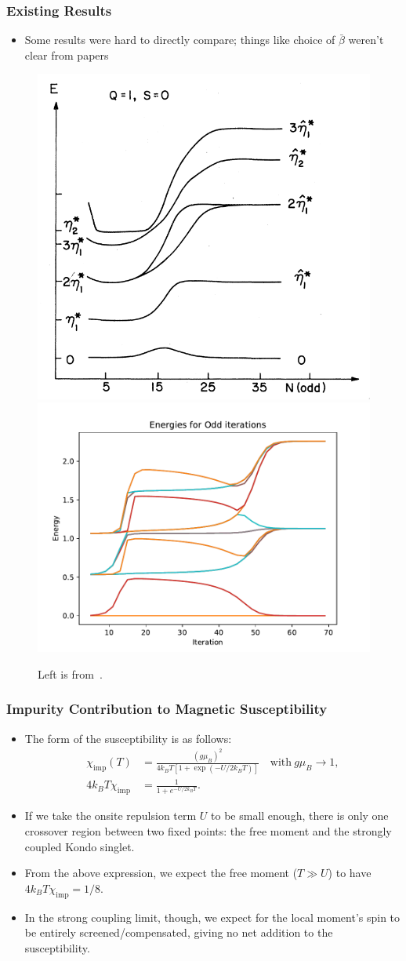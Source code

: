 \documentclass{beamer}
\begin{document}
\begin{frame}
  \frametitle{Existing Results}

  \begin{itemize}
  \item Some results were hard to directly compare; things like choice of $\bar{\beta}$ weren't clear from papers
  \end{itemize}

  \begin{figure}
    \centering
    \includegraphics[width=0.49\linewidth]{./gfx/krishna-murthy-energies.png}
    \includegraphics[width=0.49\linewidth]{./gfx/odd.pdf}
    \caption{Left is from~\cite{Krishna-murthy_Wilkins_Wilson_1980}.}
  \end{figure}
\end{frame}

\begin{frame}
  \frametitle{Impurity Contribution to Magnetic Susceptibility}

  \begin{itemize}
  \item The form of the susceptibility is as follows:
    \begin{align*}
      \chi_{\mathrm{imp}}(T) &= \frac{(g\mu_B)^2}{4k_BT[1 + \exp(-U/2k_BT)]} \quad\text{with}\ g\mu_B \rightarrow 1, \\
      4k_BT\chi_{\mathrm{imp}} &= \frac{1}{1 + e^{-U/2k_BT}}.
    \end{align*}
  \item If we take the onsite repulsion term $U$ to be small enough, there is only one crossover region between two fixed points: the free moment and the strongly coupled Kondo singlet.
  \item From the above expression, we expect the free moment ($T \gg U$) to have $4k_BT\chi_{\mathrm{imp}} = 1/8$.
  \item In the strong coupling limit, though, we expect for the local moment's spin to be entirely screened/compensated, giving no net addition to the susceptibility.
  \end{itemize}
\end{frame}
\end{document}
